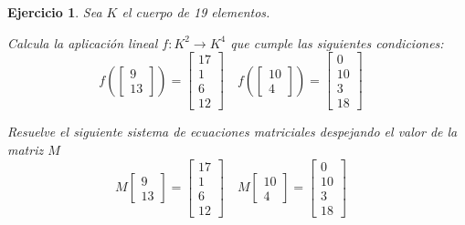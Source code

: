 \documentclass[12pt]{amsart}
\newtheorem{ejer}{Ejercicio}
\begin{document}
\begin{ejer} Sea $K$ el cuerpo de 19 elementos.
\newline
\noindent\begin{minipage}{\textwidth}
\begin{tcolorbox}[colback = green!20!white,title=Versión Aplicación]
Calcula la aplicaci\'on lineal $f:K^{2} \to K^{4}$ que cumple las siguientes condiciones: 
\[f\left(\left[\begin{array}{r}
9 \\
13
\end{array}\right]\right) = \left[\begin{array}{r}
17 \\
1 \\
6 \\
12
\end{array}\right] \quad f\left(\left[\begin{array}{r}
10 \\
4
\end{array}\right]\right) = \left[\begin{array}{r}
0 \\
10 \\
3 \\
18
\end{array}\right] \quad 
\]\end{tcolorbox}
\end{minipage} \newline
\noindent\begin{minipage}{\textwidth}
\begin{tcolorbox}[colback = blue!20!white,title=Versión Sistema Matricial]
Resuelve el siguiente sistema de ecuaciones matriciales despejando el valor de la matriz $M$
\[M \left[\begin{array}{r}
9 \\
13
\end{array}\right] = \left[\begin{array}{r}
17 \\
1 \\
6 \\
12
\end{array}\right] \quad M \left[\begin{array}{r}
10 \\
4
\end{array}\right] = \left[\begin{array}{r}
0 \\
10 \\
3 \\
18
\end{array}\right] \quad 
\]
\end{tcolorbox}
\end{minipage}
\end{ejer}
\end{document}
